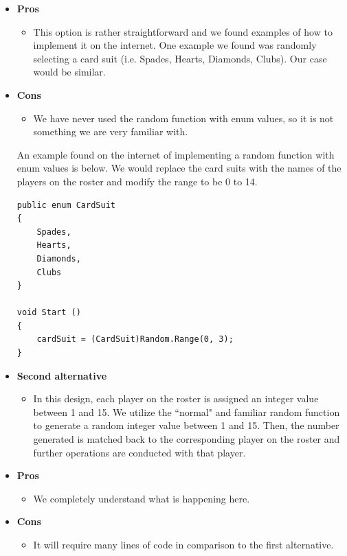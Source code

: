 \documentclass[]{report}   %
\begin{document}
\begin{itemize}
\begin{itemize}
\vspace{.2in}

	\item \textbf{Pros}
		\begin{itemize}
		\item This option is rather straightforward and we found examples of how to implement it on the internet. One example we found was randomly selecting a card suit (i.e. Spades, Hearts, Diamonds, Clubs). Our case would be similar.
		\end{itemize}
	\item \textbf{Cons}
		\begin{itemize}
		\item We have never used the random function with enum values, so it is not something we are very familiar with.
		\end{itemize}
		
		An example found on the internet of implementing a random function with enum values is below. We would replace the card suits with the names of the players on the roster and modify the range to be 0 to 14.
	


\belowcaptionskip=-10pt
\begin{lstlisting}
public enum CardSuit
{
	Spades,
	Hearts,
	Diamonds,
	Clubs
}

void Start ()
{
	cardSuit = (CardSuit)Random.Range(0, 3);
}
\end{lstlisting}

		
	\item \textbf{Second alternative}
		\begin{itemize}
		\item In this design, each player on the roster is assigned an integer value between 1 and 15. We utilize the ``normal" and familiar random function to generate a random integer value between 1 and 15. Then, the number generated is matched back to the corresponding player on the roster and further operations are conducted with that player.
		\end{itemize}
	\item \textbf{Pros}
		\begin{itemize}
		\item We completely understand what is happening here. 
		\end{itemize}
	\item \textbf{Cons}
		\begin{itemize}
		\item It will require many lines of code in comparison to the first alternative.
		\end{itemize}
		

\end{itemize}
\end{itemize}
\end{document}
